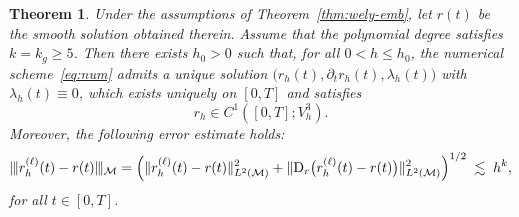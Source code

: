 \documentclass[11pt,a4paper,oneside,reqno]{amsart}
\theoremstyle{definition}
\theoremstyle{plain}
\newtheorem{theorem}{Theorem}
\numberwithin{theorem}{section}
\numberwithin{proposition}{section}
\numberwithin{lemma}{section}
\numberwithin{equation}{section}
\newcommand{\Man}{\mathcal{M}}
\newcommand{\normt}[1]{%
	\vert\kern-0.9pt\vert\kern-0.9pt\vert #1
	\vert\kern-0.9pt\vert\kern-0.9pt\vert}
\begin{document}



\begin{theorem}\label{thm:err}
Under the assumptions of Theorem~\ref{thm:wely-emb}, let \(r(t)\) be the smooth solution obtained therein.
Assume that the polynomial degree satisfies \(k=k_g\ge 5\).
Then there exists \(h_0>0\) such that, for all \(0<h\le h_0\), the numerical scheme~\eqref{eq:num} admits a unique solution
\(\bigl(r_h(t),\partial_t r_h(t),\lambda_h(t)\bigr)\) with \(\lambda_h(t)\equiv 0\), which exists uniquely on \([0,T]\) and satisfies
\[
r_h \in C^1([0,T];V_h^3).
\]
Moreover, the following error estimate holds:
\[
\normt{r_h^{(\ell)}(t)-r(t)}_{\Man}
=\Big(\|r_h^{(\ell)}(t)-r(t)\|_{L^2(\Man)}^2
+\|{\rm D}_r\bigl(r_h^{(\ell)}(t)-r(t)\bigr)\|_{L^2(\Man)}^2\Big)^{1/2}
\;\lesssim\; h^{k},
\]
for all \(t\in[0,T]\).
\end{theorem}
\end{document}

